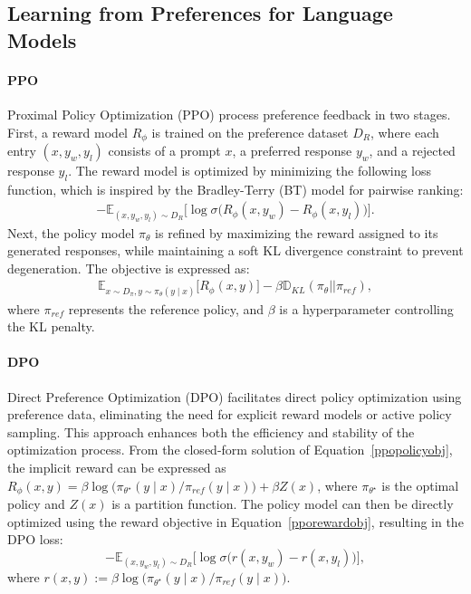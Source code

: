 \subsection{Learning from Preferences for Language Models}

\paragraph{PPO} Proximal Policy Optimization (PPO) \citep{schulman2017proximal} process preference feedback in two stages. First, a reward model \( R_{\phi} \) is trained on the preference dataset \( D_{R} \), where each entry \( (x, y_w, y_l) \) consists of a prompt \( x \), a preferred response \( y_w \), and a rejected response \( y_l \). The reward model is optimized by minimizing the following loss function, which is inspired by the Bradley-Terry (BT) model \citep{bradley1952rank} for pairwise ranking:
\begin{align}
\label{pporewardobj}
- \mathbb{E}_{(x, y_w, y_l) \sim D_{R}} \big[\log \sigma \big(R_{\phi}(x, y_w) - R_{\phi}(x, y_l)\big)\big].
\end{align}
Next, the policy model \( \pi_{\theta} \) is refined by maximizing the reward assigned to its generated responses, while maintaining a soft KL divergence constraint to prevent degeneration. The objective is expressed as:
\begin{align}
\label{ppopolicyobj}
\mathbb{E}_{x \sim D_{\pi}, y \sim \pi_{\theta}(y \mid x)} \big[R_{\phi}(x, y)\big] - \beta \mathbb{D}_{KL} (\pi_{\theta} || \pi_{ref}),
\end{align}
where \( \pi_{ref} \) represents the reference policy, and \( \beta \) is a hyperparameter controlling the KL penalty.




\paragraph{DPO} Direct Preference Optimization (DPO) \citep{rafailov2024direct} facilitates direct policy optimization using preference data, eliminating the need for explicit reward models or active policy sampling. This approach enhances both the efficiency and stability of the optimization process. From the closed-form solution of Equation~\ref{ppopolicyobj}, the implicit reward can be expressed as \( R_{\phi}(x, y) =  \beta \log \big(\pi_{\theta^{\star}}(y \mid x) / \pi_{ref}(y \mid x)\big) + \beta Z(x)\), where \( \pi_{\theta^{\star}} \) is the optimal policy and $Z(x)$ is a partition function. The policy model can then be directly optimized using the reward objective in Equation~\ref{pporewardobj}, resulting in the DPO loss:
\[
- \mathbb{E}_{(x, y_w, y_l) \sim D_{R}} \big[\log \sigma \big(r(x, y_w) - r(x, y_l)\big)\big],
\]
where $r(x, y) := \beta \log \big(\pi_{\theta^{\star}}(y \mid x) / \pi_{ref}(y \mid x)\big)$.

